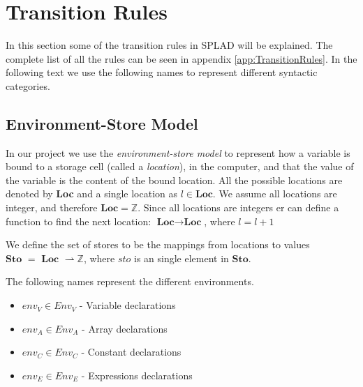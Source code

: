 \section{Transition Rules}
In this section some of the transition rules in SPLAD will be explained. The complete list of all the rules can be seen in appendix \ref{app:TransitionRules}.
In the following text we use the following names to represent different syntactic categories.

\begin{itemize}
\item $n \in \textbf{Num}$ - Numerals
\item $v$ - Values
\item $x \in \textbf{Var}$ - Variables 
\item $r \in \textbf{Arrays}$ - Array names
\item $a \in A{exp}$ - Arithmetic expression
\item $b \in B{exp}$ - Boolean expression
\item $e \in A_{exp} \cup B_{exp}$} - expressions
\item $C \in \textbf{Com}$ - Commands
\end{itemize}

\subsection{Environment-Store Model}
In our project we use the \textit{environment-store model} to represent how a variable is bound to a storage cell (called a \textit{location}), in the computer, and that the value of the variable is the content of the bound location. All the possible locations are denoted by \textbf{Loc} and a single location as $l \in \textbf{Loc}$. We assume all locations are integer, and therefore $\textbf{Loc} = \mathbb{Z}$. Since all locations are integers er can define a function to find the next location: $\textbf{Loc} \rightarrow \textbf{Loc}$, where $l = l + 1$

We define the set of stores to be the mappings from locations to values $\textbf{Sto } = \textbf{ Loc } \rightharpoonup \mathbb{Z}$, where $sto$ is an single element in $\textbf{Sto}$.

The following names represent the different environments.
\begin{itemize}
\item $env_V \in Env_V$ - Variable declarations
\item $env_A \in Env_A$ - Array declarations
\item $env_C \in Env_C$ - Constant declarations
\item $env_E \in Env_E$ - Expressions declarations
\end{itemize}


